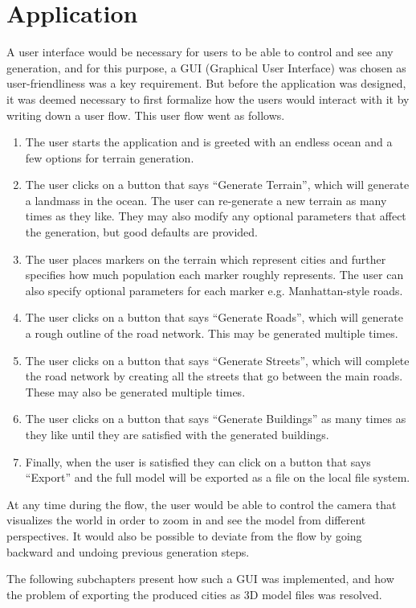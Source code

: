 \section{Application}

A user interface would be necessary for users to be able to control and see any generation, and for this purpose, a GUI (Graphical User Interface) was chosen as user-friendliness was a key requirement.
But before the application was designed, it was deemed necessary to first formalize how the users would interact with it by writing down a user flow.
This user flow went as follows.

\begin{enumerate}
\item The user starts the application and is greeted with an endless ocean and a few options for terrain generation.
\item The user clicks on a button that says “Generate Terrain”, which will generate a landmass in the ocean. The user can re-generate a new terrain as many times as they like. They may also modify any optional parameters that affect the generation, but good defaults are provided.
\item The user places markers on the terrain which represent cities and further specifies how much population each marker roughly represents. The user can also specify optional parameters for each marker e.g. Manhattan-style roads.
\item The user clicks on a button that says “Generate Roads”, which will generate a rough outline of the road network. This may be generated multiple times.
\item The user clicks on a button that says “Generate Streets”, which will complete the road network by creating all the streets that go between the main roads. These may also be generated multiple times.
\item The user clicks on a button that says “Generate Buildings” as many times as they like until they are satisfied with the generated buildings.
\item Finally, when the user is satisfied they can click on a button that says “Export” and the full model will be exported as a file on the local file system.
\end{enumerate}

At any time during the flow, the user would be able to control the camera that visualizes the world in order to zoom in and see the model from different perspectives.
It would also be possible to deviate from the flow by going backward and undoing previous generation steps.

The following subchapters present how such a GUI was implemented, and how the problem of exporting the produced cities as 3D model files was resolved.


